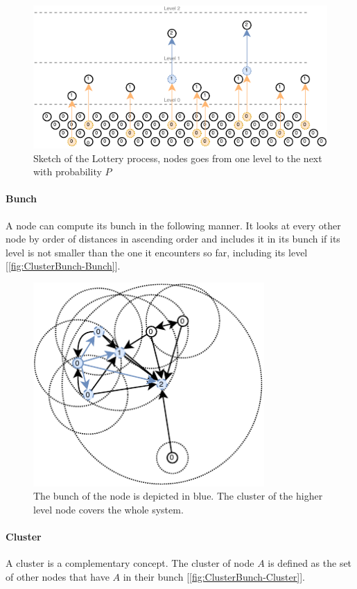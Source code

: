 \documentclass[a4paper,11pt,oneside]{report}
\begin{document}
\begin{figure}[!h] 
\centering
\includegraphics[width=400pt]{figures/Lottery-Standard}
\caption{Sketch of the Lottery process, nodes goes from one level to the next with probability $P$}
\label{fig:ClusterBunch-Bunch}
\end{figure}

\paragraph{Bunch} A node can compute its bunch in the following manner. It
looks at every other node by order of distances in ascending order and
includes it in its bunch if its level is not smaller than the one it encounters
so far, including its level [\autoref{fig:ClusterBunch-Bunch}]. 

\begin{figure}[!h] 
\centering
\includegraphics[width=250pt]{figures/ClusterBunch-Bunch}
\caption{ The bunch of the node is depicted in blue. The cluster of the higher level node covers the whole system. }
\label{fig:ClusterBunch-Bunch}
\end{figure}

\paragraph{Cluster} A cluster is a complementary concept. The cluster of node
$A$ is defined as the set of other nodes that have $A$ in their bunch [\autoref{fig:ClusterBunch-Cluster}]. 
\end{document}
